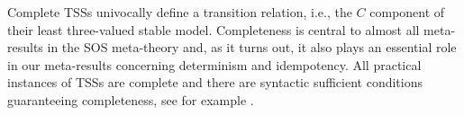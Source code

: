 Complete TSSs univocally define a transition relation, i.e., the $C$ component of their least three-valued stable model.
Completeness is central to almost all meta-results in the SOS meta-theory and,
as it turns out, it also plays an essential role in our meta-results concerning determinism and idempotency.
All practical instances of TSSs are complete and
there are syntactic sufficient conditions guaranteeing completeness, see for example \cite{Groote93}.
